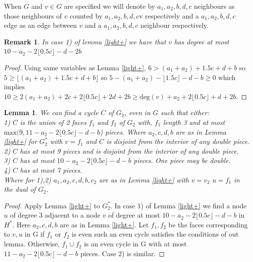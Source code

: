 \documentclass{article}
\newcommand{\0}{\mathbb{0}}
\newcommand{\1}{\mathbb{1}}
\newtheorem{lemma}[theorem]{Lemma}
\newtheorem{remark}[theorem]{Remark}
\begin{document}
When  $G$ and $v\in G$ are specified we will denote by $a_1,a_2,b,d,c$ neighbours as those neighbours of $v$ counted by $a_1,a_2,b,d,c$v respectively and a $a_1,a_2,b,d,c$  edge as an edge between $v$ and a $a_1,a_2,b,d,c$ neighbour respectively.
%
\begin{remark}\label{light+r}
In case 1) of lemma \ref{light+} we have that $v$ has degree at most $ 10 - a_2 -2 \lfloor 0.5c \rfloor -d -2b$
\end{remark}
\begin{proof}  Using same variables as Lemma \ref{light+}, $ 6 > (a_1+a_2) +1.5c +d +b $ so $ 5 \geq \lfloor (a_1+a_2) +1.5c +d +b \rfloor $ so  $ 5-(a_1+a_2) - \lfloor 1.5c \rfloor -d -b \geq 0$ which implies $  10 \geq 2(a_1+a_2) +2c +2 \lfloor 0.5c \rfloor +2d +2b \geq \text{deg}(v)  +a_2 +2 \lfloor 0.5c \rfloor +d +2b  $.
\end{proof}
%
\begin{lemma}\label{even reduced+}
We can find a cycle $C$ of $G_2$, even in $G$ such that either: \\
1)  $C$ is the union of 2 faces $f_1$ and $f_2$ of $G_2$ with, $f_1$ length 3 and at most  $ \text{max}(9, 11- a_2 -2 \lfloor 0.5 c \rfloor -d  -b $) pieces.   Where $ a_2, c ,d ,b $ are as in Lemma \ref{light+}  for $G_2^*$ with $v=f_1$  and $C$ is disjoint from the interior of any double piece. \\ 
2) $C$ has at most 9 pieces and is disjoint from the interior of any double piece. \\
3) $C$ has at most $10- a_2 -2 \lfloor 0.5 c \rfloor -d  -b $  pieces. One piece may be double. \\
4) $C$ has at most 7 pieces. \\
Where for 1),2) $a_1,a_2, c, d, b ,c_2$ are as in Lemma \ref{light+} with  $ v=v_2$  $u=f_1$ in the dual of $G_2$.
\end{lemma}
\begin{proof}
 Apply Lemma \ref{light+} to $G_2^*$.  In case 1) of Lemma \ref{light+}  we find a node $u$ of degree 3 adjacent to a node $v$ of degree at most $10-a_2-2\lfloor 0.5 c \rfloor -d -b$  in $H^*$. Here $a_2,c,d,b$ are as in Lemma \ref{light+}. Let $f_1 , f_2$ be the faces corresponding to $v,u$ in G if $f_1$ or $f_2$ is even such an even cycle satisfies the conditions of out lemma. Otherwise, $f_1 \cup f_2$ is an even cycle in G with at most  $11- a_2 -2 \lfloor 0.5 c \rfloor -d  -b $ pieces. Case 2) is similar.
\end{proof}
\end{document}
